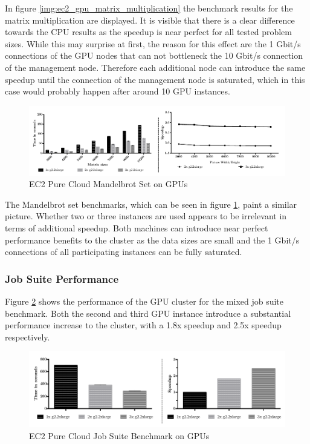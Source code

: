 In figure \ref{img:ec2_gpu_matrix_multiplication} the benchmark results for the matrix multiplication are displayed. It is visible that there is a clear difference towards the CPU results as the speedup is near perfect for all tested problem sizes. While this may surprise at first, the reason for this effect are the 1 Gbit/s connections of the GPU nodes that can not bottleneck the 10 Gbit/s connection of the management node. Therefore each additional node can introduce the same speedup until the connection of the management node is saturated, which in this case would probably happen after around 10 GPU instances.

\begin{figure}[!htb]
	\includegraphics[width=1.0\textwidth]{images/ec2_gpu_mandelbrot.pdf}
	\centering
	\caption{EC2 Pure Cloud Mandelbrot Set on GPUs}
	\label{img:ec2_gpu_mandelbrot}
\end{figure}

The Mandelbrot set benchmarks, which can be seen in figure \ref{img:ec2_gpu_mandelbrot}, paint a similar picture. Whether two or three instances are used appears to be irrelevant in terms of additional speedup. Both machines can introduce near perfect performance benefits to the cluster as the data sizes are small and the 1 Gbit/s connections of all participating instances can be fully saturated.

\subsubsection*{Job Suite Performance}
Figure \ref{img:ec2_gpu_full_benchmark} shows the performance of the GPU cluster for the mixed job suite benchmark. Both the second and third GPU instance introduce a substantial performance increase to the cluster, with a 1.8x speedup and 2.5x speedup respectively.

\begin{figure}[!htb]
	\includegraphics[width=1.0\textwidth]{images/ec2_gpu_full_benchmark.pdf}
	\centering
	\caption{EC2 Pure Cloud Job Suite Benchmark on GPUs}
	\label{img:ec2_gpu_full_benchmark}
\end{figure}
